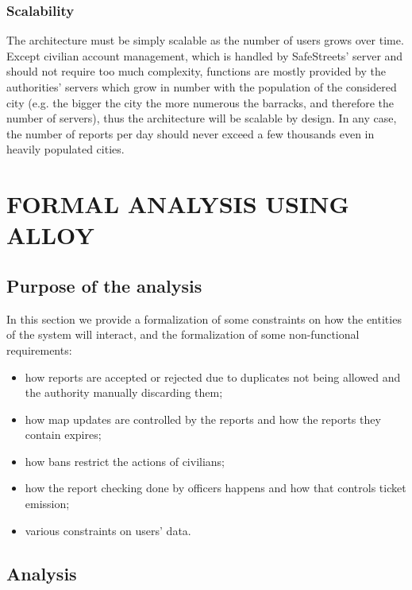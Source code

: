 \documentclass[12pt,a4paper]{article}
\begin{document}
\subsubsection{Scalability}
The architecture must be simply scalable as the number of users grows over time. Except civilian account management, which is handled by SafeStreets' server and should not require too much complexity, functions are mostly provided by the authorities' servers which grow in number with the population of the considered city (e.g. the bigger the city the more numerous the barracks, and therefore the number of servers), thus the architecture will be scalable by design. In any case, the number of reports per day should never exceed a few thousands even in heavily populated cities.
\newpage
\section{FORMAL ANALYSIS USING ALLOY}
\subsection{Purpose of the analysis}
In this section we provide a formalization of some constraints on how the entities of the system will interact, and the formalization of some non-functional requirements:
\begin{itemize}
 \item how reports are accepted or rejected due to duplicates not being allowed and the authority manually discarding them;
 \item how map updates are controlled by the reports and how the reports they contain expires;
 \item how bans restrict the actions of civilians;
 \item how the report checking done by officers happens and how that controls ticket emission;
 \item various constraints on users' data.
\end{itemize}
\newpage
\subsection{Analysis}
\end{document}
